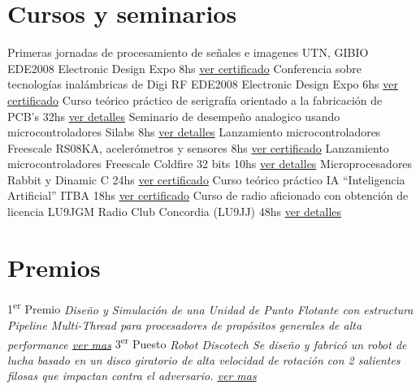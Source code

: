 \documentclass[11pt,a4paper,sans]{moderncv} 	%
\begin{document}
\section{Cursos y seminarios}
 		{Primeras jornadas de procesamiento de señales e imagenes}			{UTN, GIBIO EDE2008 Electronic Design Expo} 	{8hs}  	{\href{http://disenioconingenio.com.ar/producto.php?products_id=396}{ver certificado}} 	{}{}
 		{Conferencia sobre tecnologías inalámbricas de Digi RF}				{EDE2008 Electronic Design Expo} 		{6hs}  	{\href{http://disenioconingenio.com.ar/producto.php?products_id=394}{ver certificado}} 	{}{}
 		{Curso teórico práctico de serigrafía orientado a la fabricación de PCB's}	{32hs} 				 			{\href{http://disenioconingenio.com.ar/producto.php?products_id=389}{ver detalles}} 	{}{}
 		{Seminario de desempeño analogico usando microcontroladores Silabs}		{8hs} 				 			{\href{http://disenioconingenio.com.ar/producto.php?products_id=389}{ver detalles}} 	{}{}
 		{Lanzamiento microcontroladores Freescale RS08KA, acelerómetros y sensores} 	{8hs} 							{\href{http://disenioconingenio.com.ar/producto.php?products_id=384}{ver certificado}} 	{}{}
 		{Lanzamiento microcontroladores Freescale Coldfire 32 bits} 			{10hs}			 				{\href{http://disenioconingenio.com.ar/producto.php?products_id=384}{ver detalles}} 	{}{}
 		{Microprocesadores Rabbit y Dinamic C} 						{24hs}			 				{\href{http://disenioconingenio.com.ar/producto.php?products_id=386}{ver certificado}} 	{}{}
 		{Curso teórico práctico IA “Inteligencia Artificial”} 				{ITBA} 						{18hs} 	{\href{http://disenioconingenio.com.ar/producto.php?products_id=387}{ver certificado}} 	{}{}
 		{Curso de radio aficionado con obtención de licencia LU9JGM} 			{Radio Club Concordia (LU9JJ)} 			{48hs} 	{\href{http://disenioconingenio.com.ar/producto.php?products_id=388}{ver detalles}} 	{}{}
\section{Premios}
 					{1\textsuperscript{er} Premio} {}{}{\em{Diseño y Simulación de una Unidad de Punto Flotante con estructura Pipeline Multi-Thread para procesadores de propósitos generales de alta performance} \em \href{http://disenioconingenio.com.ar/shop/docs/i+d_itba_2002.pdf}{ver mas}}
	{3\textsuperscript{er} Puesto} {}{}{\em{Robot Discotech} \newline \em{Se diseño y fabricó un robot de lucha basado en un disco giratorio de alta velocidad de rotación con 2 salientes filosas que impactan contra el adversario. \href{http://disenioconingenio.com.ar/producto.php?products_id=378}{ver mas}}}
\end{document}
